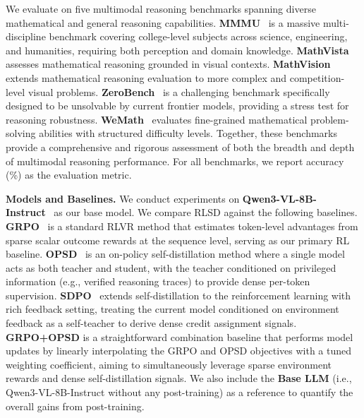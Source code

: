 \documentclass[]{jingdong}
\begin{document}
We evaluate on five multimodal reasoning benchmarks spanning diverse mathematical and general reasoning capabilities. \textbf{MMMU}~\citep{mmmu} is a massive multi-discipline benchmark covering college-level subjects across science, engineering, and humanities, requiring both perception and domain knowledge. \textbf{MathVista}~\citep{mathvista} assesses mathematical reasoning grounded in visual contexts. \textbf{MathVision}~\citep{mathvision} extends mathematical reasoning evaluation to more complex and competition-level visual problems. \textbf{ZeroBench}~\citep{zerobench} is a challenging benchmark specifically designed to be unsolvable by current frontier models, providing a stress test for reasoning robustness. \textbf{WeMath}~\citep{wemath} evaluates fine-grained mathematical problem-solving abilities with structured difficulty levels. Together, these benchmarks provide a comprehensive and rigorous assessment of both the breadth and depth of multimodal reasoning performance. For all benchmarks, we report accuracy (\%) as the evaluation metric.

\noindent \textbf{Models and Baselines.}
We conduct experiments on \textbf{Qwen3-VL-8B-Instruct}~\citep{qwen3vl} as our base model. We compare RLSD against the following baselines. \textbf{GRPO}~\citep{grpo} is a standard RLVR method that estimates token-level advantages from sparse scalar outcome rewards at the sequence level, serving as our primary RL baseline. \textbf{OPSD}~\citep{zhao2026opsd} is an on-policy self-distillation method where a single model acts as both teacher and student, with the teacher conditioned on privileged information (e.g., verified reasoning traces) to provide dense per-token supervision. \textbf{SDPO}~\citep{hbotter2026reinforcementlearningselfdistillation_sdpo} extends self-distillation to the reinforcement learning with rich feedback setting, treating the current model conditioned on environment feedback as a self-teacher to derive dense credit assignment signals. \textbf{GRPO+OPSD} is a straightforward combination baseline that performs model updates by linearly interpolating the GRPO and OPSD objectives with a tuned weighting coefficient, aiming to simultaneously leverage sparse environment rewards and dense self-distillation signals. We also include the \textbf{Base LLM} (i.e., Qwen3-VL-8B-Instruct without any post-training) as a reference to quantify the overall gains from post-training.
\end{document}

